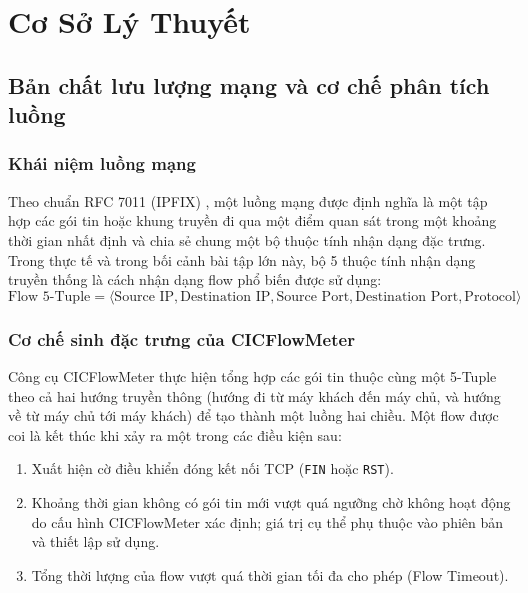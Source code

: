 
\chapter{Cơ Sở Lý Thuyết}
\label{chap:co_so_ly_thuyet}

\section{Bản chất lưu lượng mạng và cơ chế phân tích luồng}

\subsection{Khái niệm luồng mạng}
Theo chuẩn RFC 7011 (IPFIX) \cite{rfc7011}, một luồng mạng được định nghĩa là một tập hợp các gói tin hoặc khung truyền đi qua một điểm quan sát trong một khoảng thời gian nhất định và chia sẻ chung một bộ thuộc tính nhận dạng đặc trưng. Trong thực tế và trong bối cảnh bài tập lớn này, bộ 5 thuộc tính nhận dạng truyền thống là cách nhận dạng flow phổ biến được sử dụng:
\begin{equation}
    \text{Flow 5-Tuple} = \langle \text{Source IP}, \text{Destination IP}, \text{Source Port}, \text{Destination Port}, \text{Protocol} \rangle
\end{equation}

\subsection{Cơ chế sinh đặc trưng của CICFlowMeter}
Công cụ CICFlowMeter \cite{sharafaldin2018generating} thực hiện tổng hợp các gói tin thuộc cùng một 5-Tuple theo cả hai hướng truyền thông (hướng đi từ máy khách đến máy chủ, và hướng về từ máy chủ tới máy khách) để tạo thành một luồng hai chiều. Một flow được coi là kết thúc khi xảy ra một trong các điều kiện sau:
\begin{enumerate}
    \item Xuất hiện cờ điều khiển đóng kết nối TCP (\texttt{FIN} hoặc \texttt{RST}).
    \item Khoảng thời gian không có gói tin mới vượt quá ngưỡng chờ không hoạt động do cấu hình CICFlowMeter xác định; giá trị cụ thể phụ thuộc vào phiên bản và thiết lập sử dụng.
    \item Tổng thời lượng của flow vượt quá thời gian tối đa cho phép (Flow Timeout).
\end{enumerate}

